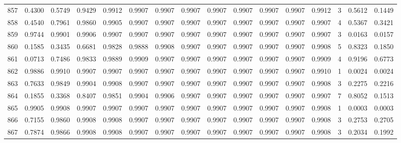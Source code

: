 \begin{tabular}{lrrrrrrrrrrrrrrr}
857 &      0.4300 &  0.5749 &  0.9429 &  0.9912 &  0.9907 &  0.9907 &  0.9907 &  0.9907 &  0.9907 &  0.9907 &   0.9907 &     0.9912 &      3 &                    0.5612 &                     0.1449 \\
858 &      0.4540 &  0.7961 &  0.9860 &  0.9905 &  0.9907 &  0.9907 &  0.9907 &  0.9907 &  0.9907 &  0.9907 &   0.9907 &     0.9907 &      4 &                    0.5367 &                     0.3421 \\
859 &      0.9744 &  0.9901 &  0.9906 &  0.9907 &  0.9907 &  0.9907 &  0.9907 &  0.9907 &  0.9907 &  0.9907 &   0.9907 &     0.9907 &      3 &                    0.0163 &                     0.0157 \\
860 &      0.1585 &  0.3435 &  0.6681 &  0.9828 &  0.9888 &  0.9908 &  0.9907 &  0.9907 &  0.9907 &  0.9907 &   0.9907 &     0.9908 &      5 &                    0.8323 &                     0.1850 \\
861 &      0.0713 &  0.7486 &  0.9833 &  0.9889 &  0.9909 &  0.9907 &  0.9907 &  0.9907 &  0.9907 &  0.9907 &   0.9907 &     0.9909 &      4 &                    0.9196 &                     0.6773 \\
862 &      0.9886 &  0.9910 &  0.9907 &  0.9907 &  0.9907 &  0.9907 &  0.9907 &  0.9907 &  0.9907 &  0.9907 &   0.9907 &     0.9910 &      1 &                    0.0024 &                     0.0024 \\
863 &      0.7633 &  0.9849 &  0.9904 &  0.9908 &  0.9907 &  0.9907 &  0.9907 &  0.9907 &  0.9907 &  0.9907 &   0.9907 &     0.9908 &      3 &                    0.2275 &                     0.2216 \\
864 &      0.1855 &  0.3368 &  0.8407 &  0.9851 &  0.9904 &  0.9906 &  0.9907 &  0.9907 &  0.9907 &  0.9907 &   0.9907 &     0.9907 &      7 &                    0.8052 &                     0.1513 \\
865 &      0.9905 &  0.9908 &  0.9907 &  0.9907 &  0.9907 &  0.9907 &  0.9907 &  0.9907 &  0.9907 &  0.9907 &   0.9907 &     0.9908 &      1 &                    0.0003 &                     0.0003 \\
866 &      0.7155 &  0.9860 &  0.9908 &  0.9908 &  0.9907 &  0.9907 &  0.9907 &  0.9907 &  0.9907 &  0.9907 &   0.9907 &     0.9908 &      3 &                    0.2753 &                     0.2705 \\
867 &      0.7874 &  0.9866 &  0.9908 &  0.9908 &  0.9907 &  0.9907 &  0.9907 &  0.9907 &  0.9907 &  0.9907 &   0.9907 &     0.9908 &      3 &                    0.2034 &                     0.1992 \\

\end{tabular}
